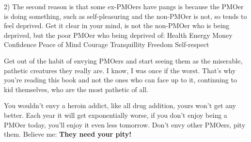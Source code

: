   2) The second reason is that some ex-PMOers have pangs is because the PMOer is doing something, such as self-pleasuring and the non-PMOer is not, so tends to feel deprived. Get it clear in your mind, is not the non-PMOer who is being deprived, but the poor PMOer who being deprived of:
    Health
    Energy
    Money
    Confidence
    Peace of Mind
    Courage
    Tranquillity
    Freedom
    Self-respect

  Get out of the habit of envying PMOers and start seeing them as the miserable, pathetic creatures they really are. I know, I was once if the worst. That's why you're reading this book and not the ones who can face up to it, continuing to kid themselves, who are the most pathetic of all.

  You wouldn't envy a heroin addict, like all drug addition, yours won't get any better. Each year it will get exponentially worse, if you don't enjoy being a PMOer today, you'll enjoy it even less tomorrow. Don't envy other PMOers, pity them. Believe me: \textbf{They need your pity!}
